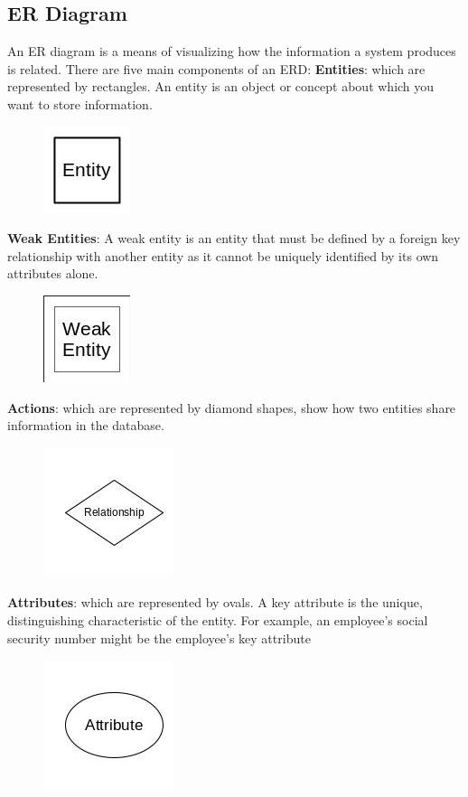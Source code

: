 \begin{spacing}{1}
\subsection{ER Diagram}
An ER diagram is a means of visualizing how the information a system produces is related. There are five main components of an ERD:
\newline
\textbf{Entities}: which are represented by rectangles. An entity is an object or concept about which you want to store information.
\begin{figure}[H]
	\centering
	\includegraphics{entity}
	\label{fig:entity}
\end{figure}
\textbf{Weak Entities}: A weak entity is an entity that must be defined by a foreign key relationship with another entity as it cannot be uniquely identified by its own attributes alone.
\begin{figure}[H]
	\centering
	\includegraphics{weak}
	\label{fig:weakentity}
\end{figure}
\textbf{Actions}: which are represented by diamond shapes, show how two entities share information in the database.
\begin{figure}[H]
	\centering
	\includegraphics{relatio}
	\label{fig:relation}
\end{figure}
\textbf{Attributes}: which are represented by ovals. A key attribute is the unique, distinguishing characteristic of the entity. For example, an employee's social security number might be the employee's key attribute
\begin{figure}[H]
	\centering
	\includegraphics{attribute}
	\label{fig:attribute}
\end{figure}


\end{spacing}

